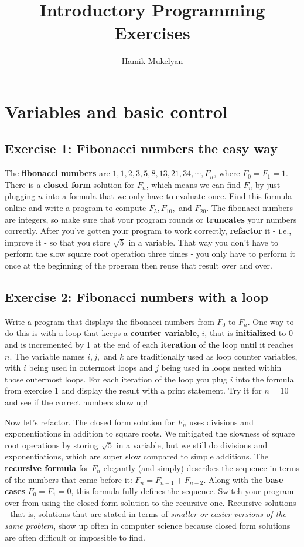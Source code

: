 \documentclass{article}
\begin{document}
\title{Introductory Programming Exercises}
\author{Hamik Mukelyan}
\maketitle

\section*{Variables and basic control}
\subsection*{Exercise 1: Fibonacci numbers the easy way}
The \textbf{fibonacci numbers} are $1, 1, 2, 3, 5, 8, 13, 21, 34, \cdots, F_{n}$, where $F_{0} = F_{1} = 1$. There is a \textbf{closed form} solution for $F_{n}$, which means we can find $F_{n}$ by just plugging $n$ into a formula that we only have to evaluate once. Find this formula online and write a program to compute $F_{5}, F_{10},$ and $F_{20}$. The fibonacci numbers are integers, so make sure that your program rounds or \textbf{truncates} your numbers correctly. After you've gotten your program to work correctly, \textbf{refactor} it - i.e., improve it - so that you store $\sqrt{5}$ in a variable. That way you don't have to perform the slow square root operation three times - you only have to perform it once at the beginning of the program then reuse that result over and over.

\subsection*{Exercise 2: Fibonacci numbers with a loop}
Write a program that displays the fibonacci numbers from $F_{0}$ to $F_{n}$. One way to do this is with a loop that keeps a \textbf{counter variable}, $i$, that is \textbf{initialized} to $0$ and is incremented by 1 at the end of each \textbf{iteration} of the loop until it reaches $n$. The variable names $i, j,$ and $k$ are traditionally used as loop counter variables, with $i$ being used in outermost loops and $j$ being used in loops nested within those outermost loops. For each iteration of the loop you plug $i$ into the formula from exercise 1 and display the result with a print statement. Try it for $n = 10$ and see if the correct numbers show up!

Now let's refactor. The closed form solution for $F_{n}$ uses divisions and exponentiations in addition to square roots. We mitigated the slowness of square root operations by storing $\sqrt{5}$ in a variable, but we still do divisions and exponentiations, which are super slow compared to simple additions. The \textbf{recursive formula} for $F_{n}$ elegantly (and simply) describes the sequence in terms of the numbers that came before it: $F_{n} = F_{n - 1} + F_{n - 2}$. Along with the \textbf{base cases} $F_{0} = F_{1} = 0$, this formula fully defines the sequence. Switch your program over from using the closed form solution to the recursive one. Recursive solutions - that is, solutions that are stated in terms of \textit{smaller or easier versions of the same problem}, show up often in computer science because closed form solutions are often difficult or impossible to find.
\end{document}
